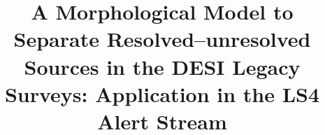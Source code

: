 \documentclass[twocolumn,tighten]{aastex631}
\begin{document}
\begin{CJK*}{UTF8}{gbsn}
\title{A Morphological Model to Separate Resolved--unresolved Sources in the DESI Legacy Surveys: Application in the LS4 Alert Stream}




\end{CJK*}
\end{document}
